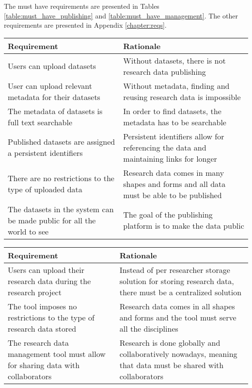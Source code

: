 The must have requirements are presented in Tables \ref{table:must_have_publishing} and
\ref{table:must_have_management}. The other requirements are presented in Appendix
\ref{chapter:reqs}.

\addtocounter{table}{-1}
\label{table:must_have_publishing}
    \begin{tabularx}{\textwidth}{| >{\raggedright}p{3cm} | X |}
    \hline
    \textbf{Requirement} & \textbf{Rationale} \\
    \hline
    \rowcolor{Gray}
    Users can upload datasets    & Without datasets, there is not research data publishing\\
    \hline
    User can upload relevant metadata for their datasets & Without metadata, finding and reusing research data is impossible\\
    \hline
    \rowcolor{Gray}
    The metadata of datasets is full text searchable    &  In order to find datasets, the metadata has to be searchable\\
    \hline
    Published datasets are assigned a persistent identifiers    & Persistent identifiers allow for referencing the data and maintaining links for longer\\
    \hline
    \rowcolor{Gray}
    There are no restrictions to the type of uploaded data          & Research data comes in many shapes and forms and all data must be able to be published\\
    \hline
    The datasets in the system can be made public for all the world to see    & The goal of the publishing platform is to make the data public\\
    \hline
\end{tabularx}

\pagebreak

\addtocounter{table}{-1}
\label{table:must_have_management}
    \begin{tabularx}{\textwidth}{| >{\raggedright}p{3cm} | X |}
    \hline
    \textbf{Requirement} & \textbf{Rationale} \\
    \hline
    \rowcolor{Gray}
    Users can upload their research data during the research project    & Instead of per researcher storage solution for storing research data, there must be a centralized solution\\
    \hline
    The tool imposes no restrictions to the type of research data stored & Research data comes in all shapes and forms and the tool must serve all the disciplines\\
    \hline
    \rowcolor{Gray}
    The research data management tool must allow for sharing data with collaborators    &  Research is done globally and collaboratively nowadays, meaning that data must be shared with collaborators\\
    \hline
\end{tabularx}

